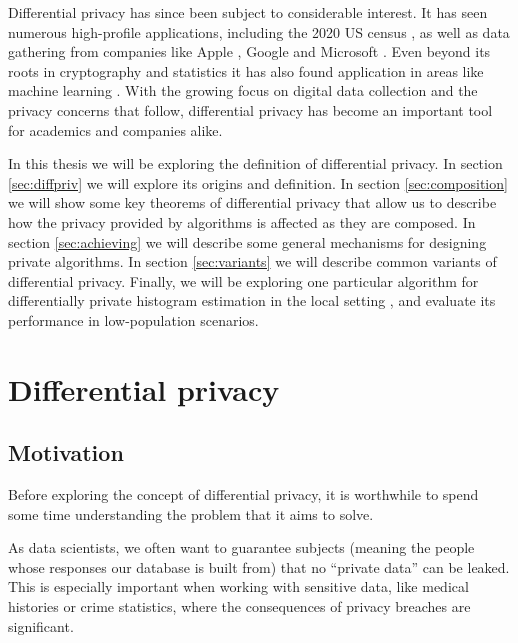 \documentclass[12pt]{article}
\begin{document}
Differential privacy has since been subject to considerable interest. It has seen numerous high-profile applications, including the 2020 US census \cite{us_census}, as well as data gathering from companies like Apple \cite{apple_differential,apple_differential_loss}, Google \cite{google_rappor,google_prochlo} and Microsoft \cite{dworketal2006,microsoft_telemetry}. Even beyond its roots in cryptography and statistics it has also found application in areas like machine learning \cite{ml_abadi,ml_shokri,ml_papernot}. With the growing focus on digital data collection and the privacy concerns that follow, differential privacy has become an important tool for academics and companies alike.

\bigskip

In this thesis we will be exploring the definition of differential privacy. In section \ref{sec:diffpriv} we will explore its origins and definition. In section \ref{sec:composition} we will show some key theorems of differential privacy that allow us to describe how the privacy provided by algorithms is affected as they are composed. In section \ref{sec:achieving} we will describe some general mechanisms for designing private algorithms. In section \ref{sec:variants} we will describe common variants of differential privacy. Finally, we will be exploring one particular algorithm for differentially private histogram estimation in the local setting \cite{microsoft_telemetry}, and evaluate its performance in low-population scenarios.

\section{Differential privacy \label{sec:diffpriv}}

\subsection{Motivation \label{sec:motivation}}

Before exploring the concept of differential privacy, it is worthwhile to spend some time understanding the problem that it aims to solve. \bigskip

As data scientists, we often want to guarantee subjects (meaning the people whose responses our database is built from) that no ``private data'' can be leaked. This is especially important when working with sensitive data, like medical histories or crime statistics, where the consequences of privacy breaches are significant.
\end{document}
